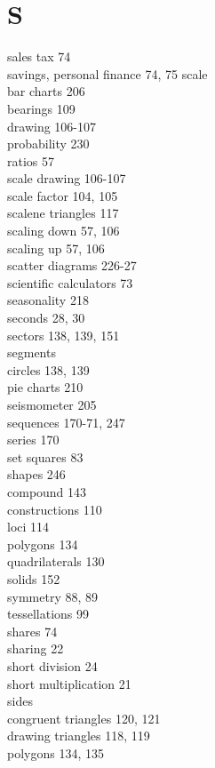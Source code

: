 \documentclass[10pt]{article}
\begin{document}
\section*{S}
sales tax 74\\
savings, personal finance 74, 75 scale\\
bar charts 206\\
bearings 109\\
drawing 106-107\\
probability 230\\
ratios 57\\
scale drawing 106-107\\
scale factor 104, 105\\
scalene triangles 117\\
scaling down 57, 106\\
scaling up 57, 106\\
scatter diagrams 226-27\\
scientific calculators 73\\
seasonality 218\\
seconds 28, 30\\
sectors 138, 139, 151\\
segments\\
circles 138, 139\\
pie charts 210\\
seismometer 205\\
sequences 170-71, 247\\
series 170\\
set squares 83\\
shapes 246\\
compound 143\\
constructions 110\\
loci 114\\
polygons 134\\
quadrilaterals 130\\
solids 152\\
symmetry 88, 89\\
tessellations 99\\
shares 74\\
sharing 22\\
short division 24\\
short multiplication 21\\
sides\\
congruent triangles 120, 121\\
drawing triangles 118, 119\\
polygons 134, 135\\
\end{document}

